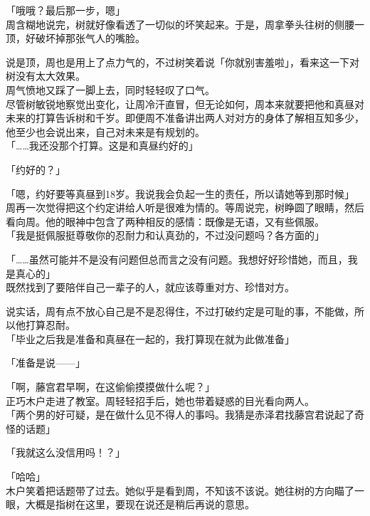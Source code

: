 「哦哦？最后那一步，嗯」\\

周含糊地说完，树就好像看透了一切似的坏笑起来。于是，周拿拳头往树的侧腰一顶，好破坏掉那张气人的嘴脸。

说是顶，周也是用上了点力气的，不过树笑着说「你就别害羞啦」，看来这一下对树没有太大效果。\\

周气愤地又踩了一脚上去，同时轻轻叹了口气。\\

尽管树敏锐地察觉出变化，让周冷汗直冒，但无论如何，周本来就要把他和真昼对未来的打算告诉树和千岁。即便周不准备讲出两人对对方的身体了解相互知多少，他至少也会说出来，自己对未来是有规划的。\\

「……我还没那个打算。这是和真昼约好的」

「约好的？」

「嗯，约好要等真昼到18岁。我说我会负起一生的责任，所以请她等到那时候」\\

周再一次觉得把这个约定讲给人听是很难为情的。等周说完，树睁圆了眼睛，然后看向周。他的眼神中包含了两种相反的感情：既像是无语，又有些佩服。\\

「我是挺佩服挺尊敬你的忍耐力和认真劲的，不过没问题吗？各方面的」

「……虽然可能并不是没有问题但总而言之没有问题。我想好好珍惜她，而且，我是真心的」\\

既然找到了要陪伴自己一辈子的人，就应该尊重对方、珍惜对方。

说实话，周有点不放心自己是不是忍得住，不过打破约定是可耻的事，不能做，所以他打算忍耐。\\

「毕业之后我是准备和真昼在一起的，我打算现在就为此做准备」

「准备是说——」

「啊，藤宫君早啊，在这偷偷摸摸做什么呢？」\\

正巧木户走进了教室。周轻轻招手后，她也带着疑惑的目光看向两人。\\

「两个男的好可疑，是在做什么见不得人的事吗。我猜是赤泽君找藤宫君说起了奇怪的话题」

「我就这么没信用吗！？」

「哈哈」\\

木户笑着把话题带了过去。她似乎是看到周，不知该不该说。她往树的方向瞄了一眼，大概是指树在这里，要现在说还是稍后再说的意思。

